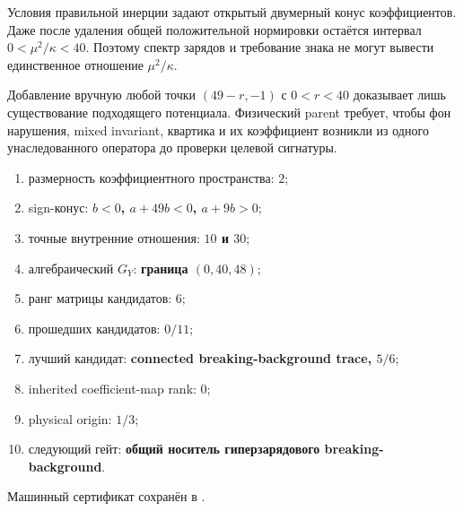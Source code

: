 \begin{theorem}
Условия правильной инерции задают открытый двумерный конус коэффициентов.
Даже после удаления общей положительной нормировки остаётся интервал
$0<\mu^2/\kappa<40$. Поэтому спектр зарядов и требование знака не могут
вывести единственное отношение $\mu^2/\kappa$.
\end{theorem}

\begin{nogocriterion}
Добавление вручную любой точки $(49-r,-1)$ с $0<r<40$ доказывает лишь
существование подходящего потенциала. Физический parent требует, чтобы фон
нарушения, mixed invariant, квартика и их коэффициент возникли из одного
унаследованного оператора до проверки целевой сигнатуры.
\end{nogocriterion}

\begin{protocol}\begin{enumerate}
\item размерность коэффициентного пространства: \textbf{$2$};
\item sign-конус: \textbf{$b<0$, $a+49b<0$, $a+9b>0$};
\item точные внутренние отношения: \textbf{$10$ и $30$};
\item алгебраический $G_Y$: \textbf{граница $(0,40,48)$};
\item ранг матрицы кандидатов: \textbf{$6$};
\item прошедших кандидатов: \textbf{$0/11$};
\item лучший кандидат: \textbf{connected breaking-background trace, $5/6$};
\item inherited coefficient-map rank: \textbf{$0$};
\item physical origin: \textbf{$1/3$};
\item следующий гейт: \textbf{общий носитель гиперзарядового breaking-background}.
\end{enumerate}\end{protocol}

Машинный сертификат сохранён в
.